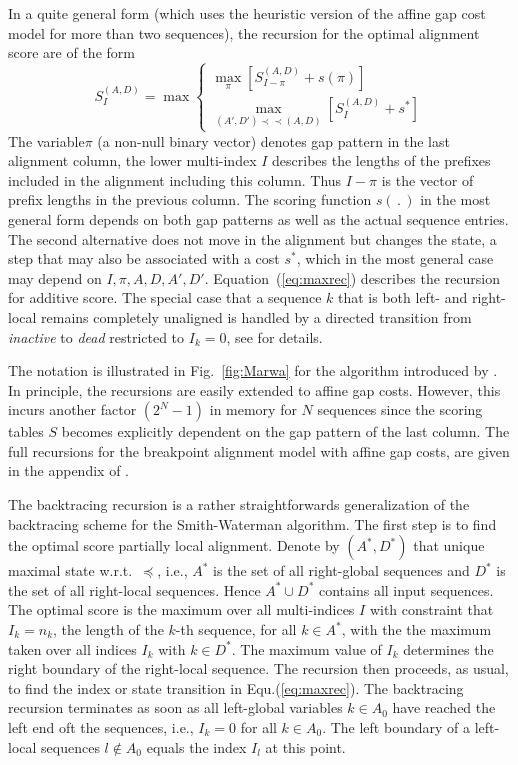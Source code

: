 \documentclass[a4paper,10pt]{article}
\newcommand{\pprec}{\mathrel{\prec\!\!\!\prec}}
\begin{document}
In a quite general form (which uses the heuristic version of the affine gap
cost model for more than two sequences), the recursion for the optimal
alignment score are of the form
\begin{equation} 
  S^{(A,D)}_I = \max 
      \begin{cases}
        \displaystyle\max_{\pi} 
            \left[ S^{(A,D)}_{I-\pi} + s(\pi)
                    \right]
        \\
        \displaystyle\max_{(A',D')\pprec(A,D)}  
                    \left[ S^{(A,D)}_I + s^*\right]
       \end{cases} 
\label{eq:maxrec}
\end{equation}
The variable$\pi$ (a non-null binary vector) denotes gap pattern in the
last alignment column, the lower multi-index $I$ describes the lengths of
the prefixes included in the alignment including this column.  Thus $I-\pi$
is the vector of prefix lengths in the previous column. The scoring
function $s(\,.\,)$ in the most general form depends on both gap patterns
as well as the actual sequence entries. The second alternative does not
move in the alignment but changes the state, a step that may also be
associated with a cost $s^*$, which in the most general case may depend on
$I,\pi,A,D,A',D'$. Equation~(\ref{eq:maxrec}) describes the recursion for
additive score. The special case that a sequence $k$ that is both left- and
right-local remains completely unaligned is handled by a directed
transition from \textit{inactive} to \textit{dead} restricted to $I_k=0$,
see \citet{Retzlaff:18a} for details.

The notation is illustrated in Fig.~\ref{fig:Marwa} for the algorithm
introduced by \citet{AlArab:17a}. In principle, the recursions are easily
extended to affine gap costs. However, this incurs another factor $(2^N-1)$
in memory for $N$ sequences since the scoring tables $S$ becomes explicitly
dependent on the gap pattern of the last column. The full recursions for
the breakpoint alignment model with affine gap costs, are given in the
appendix of \citet{Retzlaff:18a}.

The backtracing recursion is a rather straightforwards generalization of
the backtracing scheme for the Smith-Waterman algorithm. The first step is
to find the optimal score partially local alignment. Denote by $(A^*,D^*)$
that unique maximal state w.r.t.\ $\preceq$, i.e., $A^*$ is the set of all
right-global sequences and $D^*$ is the set of all right-local
sequences. Hence $A^*\cup D^*$ contains all input sequences.  The optimal
score is the maximum over all multi-indices $I$ with constraint that
$I_k=n_k$, the length of the $k$-th sequence, for all $k\in A^*$, with the
the maximum taken over all indices $I_k$ with $k\in D^*$.  The maximum
value of $I_k$ determines the right boundary of the right-local sequence.
The recursion then proceeds, as usual, to find the index or state
transition in Equ.(\ref{eq:maxrec}). The backtracing recursion terminates
as soon as all left-global variables $k\in A_0$ have reached the left end
oft the sequences, i.e., $I_k=0$ for all $k\in A_0$.  The left boundary of
a left-local sequences $l\notin A_0$ equals the index $I_l$ at this point.
\end{document}
